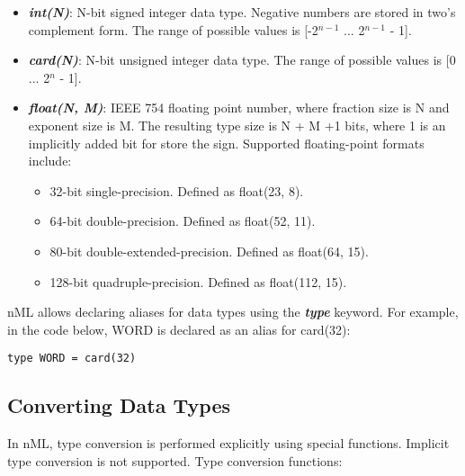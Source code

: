 \begin{itemize}

\item \textbf{\textit{int(N)}}:
N-bit signed integer data type. Negative numbers are stored in two's complement
form. The range of possible values is [-2$^{n-1}$ ... 2$^{n-1}$ - 1].

\item \textbf{\textit{card(N)}}:
N-bit unsigned integer data type. The range of possible values is [0 ... 2$^n$ - 1].

\item \textbf{\textit{float(N, M)}}: IEEE 754 floating point number, where fraction
size is N and exponent size is M. The resulting type size is N + M +1 bits, where 1
is an implicitly added bit for store the sign. Supported floating-point formats include:

\begin{itemize}
\item 32-bit single-precision. Defined as float(23, 8).
\item 64-bit double-precision. Defined as float(52, 11).
\item 80-bit double-extended-precision. Defined as float(64, 15).
\item 128-bit quadruple-precision. Defined as float(112, 15).
\end{itemize}

\end{itemize}

nML allows declaring aliases for data types using the \textbf{\textit{type}} keyword.
For example, in the code below, WORD is declared as an alias for card(32):

\begin{lstlisting}
type WORD = card(32)
\end{lstlisting}

\subsection{Converting Data Types}

In nML, type conversion is performed explicitly using special functions.
Implicit type conversion is not supported. Type conversion functions:

